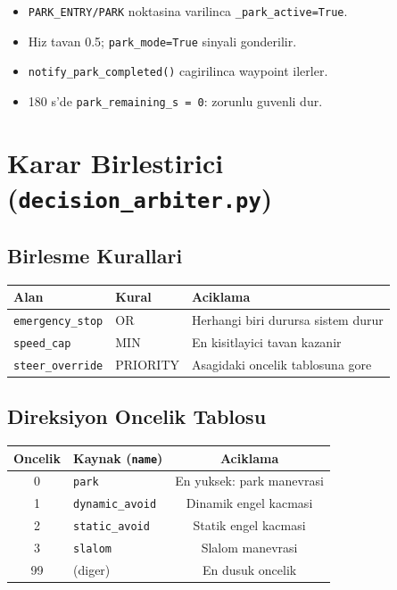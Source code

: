 \documentclass[a4paper,12pt]{article}
\begin{document}
\begin{itemize}
  \item \texttt{PARK\_ENTRY/PARK} noktasina varilinca \texttt{\_park\_active=True}.
  \item Hiz tavan 0.5; \texttt{park\_mode=True} sinyali gonderilir.
  \item \texttt{notify\_park\_completed()} cagirilinca waypoint ilerler.
  \item 180 s'de \texttt{park\_remaining\_s = 0}: zorunlu guvenli dur.
\end{itemize}

\section{Karar Birlestirici (\texttt{decision\_arbiter.py})}

\subsection{Birlesme Kurallari}

\begin{center}
\begin{tabular}{lll}
  \toprule
  Alan                     & Kural    & Aciklama\\
  \midrule
  \texttt{emergency\_stop} & OR       & Herhangi biri durursa sistem durur\\
  \texttt{speed\_cap}      & MIN      & En kisitlayici tavan kazanir\\
  \texttt{steer\_override} & PRIORITY & Asagidaki oncelik tablosuna gore\\
  \bottomrule
\end{tabular}
\end{center}

\subsection{Direksiyon Oncelik Tablosu}

\begin{center}
\begin{tabular}{clc}
  \toprule
  Oncelik & Kaynak (\texttt{name})    & Aciklama\\
  \midrule
  0       & \texttt{park}             & En yuksek: park manevrasi\\
  1       & \texttt{dynamic\_avoid}   & Dinamik engel kacmasi\\
  2       & \texttt{static\_avoid}    & Statik engel kacmasi\\
  3       & \texttt{slalom}           & Slalom manevrasi\\
  99      & (diger)                   & En dusuk oncelik\\
  \bottomrule
\end{tabular}
\end{center}
\end{document}
